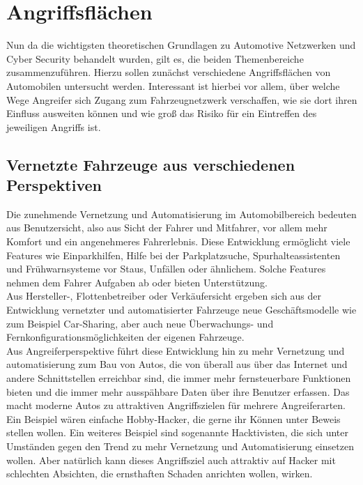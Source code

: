 






\chapter{Angriffsflächen}
Nun da die wichtigsten theoretischen Grundlagen zu Automotive Netzwerken und Cyber Security behandelt wurden, gilt es, die beiden Themenbereiche zusammenzuführen. Hierzu sollen zunächst verschiedene Angriffsflächen von Automobilen untersucht werden. Interessant ist hierbei vor allem, über welche Wege Angreifer sich Zugang zum Fahrzeugnetzwerk verschaffen, wie sie dort ihren Einfluss ausweiten können und wie groß das Risiko für ein Eintreffen des jeweiligen Angriffs ist. 



\section{Vernetzte Fahrzeuge aus verschiedenen Perspektiven}
Die zunehmende Vernetzung und Automatisierung im Automobilbereich bedeuten aus Benutzersicht, also aus Sicht der Fahrer und Mitfahrer, vor allem mehr Komfort und ein angenehmeres Fahrerlebnis. Diese Entwicklung ermöglicht viele Features wie Einparkhilfen, Hilfe bei der Parkplatzsuche, Spurhalteassistenten und Frühwarnsysteme vor Staus, Unfällen oder ähnlichem. Solche Features nehmen dem Fahrer Aufgaben ab oder bieten Unterstützung. \\
Aus Hersteller-, Flottenbetreiber oder Verkäufersicht ergeben sich aus der Entwicklung vernetzter und automatisierter Fahrzeuge neue Geschäftsmodelle wie zum Beispiel Car-Sharing, aber auch neue Überwachungs- und Fernkonfigurationsmöglichkeiten der eigenen Fahrzeuge. \\
Aus Angreiferperspektive führt diese Entwicklung hin zu mehr Vernetzung und automatisierung zum Bau von Autos, die von überall aus über das Internet und andere Schnittstellen erreichbar sind, die immer mehr fernsteuerbare Funktionen bieten und die immer mehr ausspähbare Daten über ihre Benutzer erfassen. Das macht moderne Autos zu attraktiven Angriffszielen für mehrere Angreiferarten. Ein Beispiel wären einfache Hobby-Hacker, die gerne ihr Können unter Beweis stellen wollen. Ein weiteres Beispiel sind sogenannte Hacktivisten, die sich unter Umständen gegen den Trend zu mehr Vernetzung und Automatisierung einsetzen wollen. Aber natürlich kann dieses Angriffsziel auch attraktiv auf Hacker mit schlechten Absichten, die ernsthaften Schaden anrichten wollen, wirken.


